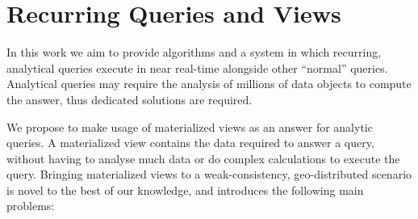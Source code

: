


\section{Recurring Queries and Views}
\label{sec:views_research_statement}

In this work we aim to provide algorithms and a system in which recurring, analytical queries execute in near real-time alongside other ``normal'' queries.
Analytical queries may require the analysis of millions of data objects to compute the answer, thus dedicated solutions are required.

We propose to make usage of materialized views as an answer for analytic queries.
A materialized view contains the data required to answer a query, without having to analyse much data or do complex calculations to execute the query.
Bringing materialized views to a weak-consistency, geo-distributed scenario is novel to the best of our knowledge, and introduces the following main problems:

